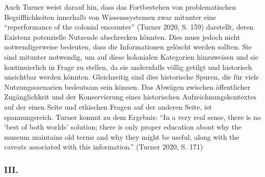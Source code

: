 \documentclass[a4paper,
fontsize=11pt,
oneside,
numbers=noperiodatend,
parskip=half-,
bibliography=totoc,
final
]{scrartcl}
\begin{document}
Auch Turner weist darauf hin, dass das Fortbestehen von problematischen
Begrifflichkeiten innerhalb von Wissenssystemen zwar mitunter eine
\enquote{reperformance of the colonial encounter} (Turner 2020, S. 159)
darstellt, deren Existenz potenzielle Nutzende abschrecken könnten. Dies
muss jedoch nicht notwendigerweise bedeuten, dass die Informationen
gelöscht werden sollten. Sie sind mitunter notwendig, um auf diese
kolonialen Kategorien hinzuweisen und sie kontinuierlich in Frage zu
stellen, da sie andernfalls völlig getilgt und historisch unsichtbar
werden könnten. Gleichzeitig sind dies historische Spuren, die für viele
Nutzungsszenarien bedeutsam sein können. Das Abwägen zwischen
öffentlicher Zugänglichkeit und der Konservierung eines historischen
Aufzeichnungskontextes auf der einen Seite und ethischen Fragen auf der
anderen Seite, ist spannungsreich. Turner kommt zu dem Ergebnis:
\enquote{In a very real sense, there is no \enquote*{best of both
worlds} solution; there is only proper education about why the museum
maintains old terms and why they might be useful, along with the caveats
associated with this information.} (Turner 2020, S. 171)

\hypertarget{iii.}{%
\subsubsection{III.}\label{iii.}}
\end{document}
